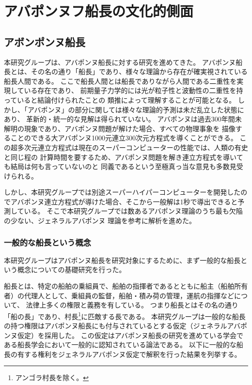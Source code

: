 \section{アバポンヌフ船長の文化的側面}
\subsection{アボンポンヌ船長}
本研究グループは、アバポンヌ船長に対する研究を進めてきた。
アバポンヌ船長とは、その名の通り「船長」であり、様々な理論から存在が確実視されている船長人間である。
ここで船長人間とは船長でありながら人間である二重性を実現している存在であり、
前期量子力学的には光が粒子性と波動性の二重性を持っていると結論付けられたことの
類推によって理解することが可能となる。
しかし、「アバポンヌ」の部分に関しては様々な理論的予測は未だ乱立した状態にあり、
革新的・統一的な見解は得られていない。
アバポンヌは過去300年間未解明の現象であり、アバポンヌ問題が解けた場合、すべての物理事象を
描像することのできる大アバポンヌ1000元連立300次元方程式を導くことができる。
この超多次元連立方程式は現在のスーパーコンピューターの性能では、人類の有史と同じ程の
計算時間を要するため、アバポンヌ問題を解き連立方程式を導いても結局は何も言っていないのと
同義であるという至極真っ当な意見も多数見受けられる。\par

しかし、本研究グループでは別途スーパーハイパーコンピューターを開発したのでアバポンヌ連立方程式が導けた場合、そこから一般解は1秒で導出できると予測している。
そこで本研究グループでは数あるアバポンヌ理論のうち最も欠陥の少ない、ジェネラルアバポンヌ
理論を参考に解析を進めた。

\subsubsection{一般的な船長という概念}
本研究グループはアバポンヌ船長を研究対象にするために、まず一般的な船長という概念についての基礎研究を行った。\par
船長とは、特定の船舶の乗組員で、船舶の指揮者であるとともに船主（船舶所有者）の代理人として、乗組員の監督，船舶・積み荷の管理，運航の指揮などについて、
法律上多くの権限と義務を有している。
つまり船長とはその名の通り「船の長」であり、村長\footnote{アンゴラ村長を除く。}に匹敵する長である。
本研究グループは一般的な船長の持つ権限はアバポンヌ船長にも付与されているとする仮定（ジェネラルアバポンヌ仮定）を採用した。
この仮定はアバポンヌ船長の研究を進めている学会である船長学会において一般的に認知されている論法である。
以下に一般的な船長の有する権利をジェネラルアバポンヌ仮定で解釈を行った結果を列挙する。

